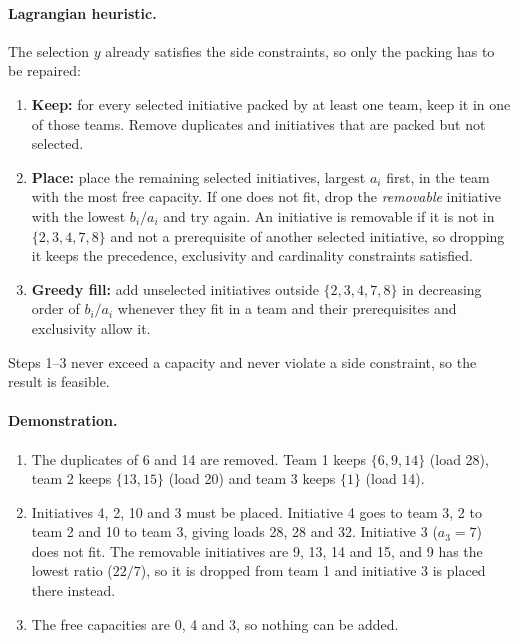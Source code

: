 \paragraph{Lagrangian heuristic.}
The selection $y$ already satisfies the side constraints, so only the packing
has to be repaired:
\begin{enumerate}
  \item \textbf{Keep:} for every selected initiative packed by at least one
        team, keep it in one of those teams. Remove duplicates and initiatives
        that are packed but not selected.
  \item \textbf{Place:} place the remaining selected initiatives, largest
        $a_i$ first, in the team with the most free capacity. If one does not
        fit, drop the \emph{removable} initiative with the lowest $b_i/a_i$
        and try again. An initiative is removable if it is not in
        $\{2,3,4,7,8\}$ and not a prerequisite of another selected initiative,
        so dropping it keeps the precedence, exclusivity and cardinality
        constraints satisfied.
  \item \textbf{Greedy fill:} add unselected initiatives outside
        $\{2,3,4,7,8\}$ in decreasing order of $b_i/a_i$ whenever they fit in
        a team and their prerequisites and exclusivity allow it.
\end{enumerate}
Steps 1--3 never exceed a capacity and never violate a side constraint, so
the result is feasible.

\paragraph{Demonstration.}
\begin{enumerate}
  \item The duplicates of 6 and 14 are removed. Team 1 keeps $\{6,9,14\}$
        (load 28), team 2 keeps $\{13,15\}$ (load 20) and team 3 keeps
        $\{1\}$ (load 14).
  \item Initiatives 4, 2, 10 and 3 must be placed. Initiative 4 goes to
        team 3, 2 to team 2 and 10 to team 3, giving loads 28, 28 and 32.
        Initiative 3 ($a_3 = 7$) does not fit. The removable initiatives are
        9, 13, 14 and 15, and 9 has the lowest ratio ($22/7$), so it is dropped
        from team 1 and initiative 3 is placed there instead.
  \item The free capacities are 0, 4 and 3, so nothing can be added.
\end{enumerate}

